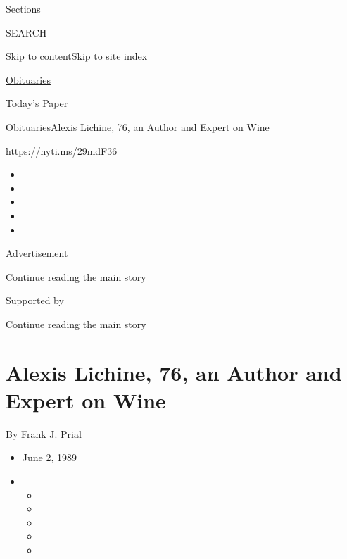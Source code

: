 Sections

SEARCH

\protect\hyperlink{site-content}{Skip to
content}\protect\hyperlink{site-index}{Skip to site index}

\href{https://www.nytimes3xbfgragh.onion/section/obituaries}{Obituaries}

\href{https://myaccount.nytimes3xbfgragh.onion/auth/login?response_type=cookie\&client_id=vi}{}

\href{https://www.nytimes3xbfgragh.onion/section/todayspaper}{Today's
Paper}

\href{/section/obituaries}{Obituaries}\textbar{}Alexis Lichine, 76, an
Author and Expert on Wine

\url{https://nyti.ms/29mdF36}

\begin{itemize}
\item
\item
\item
\item
\item
\end{itemize}

Advertisement

\protect\hyperlink{after-top}{Continue reading the main story}

Supported by

\protect\hyperlink{after-sponsor}{Continue reading the main story}

\hypertarget{alexis-lichine-76-an-author-and-expert-on-wine}{%
\section{Alexis Lichine, 76, an Author and Expert on
Wine}\label{alexis-lichine-76-an-author-and-expert-on-wine}}

By \href{https://www.nytimes3xbfgragh.onion/by/frank-j-prial}{Frank J.
Prial}

\begin{itemize}
\item
  June 2, 1989
\item
  \begin{itemize}
  \item
  \item
  \item
  \item
  \item
  \end{itemize}
\end{itemize}

